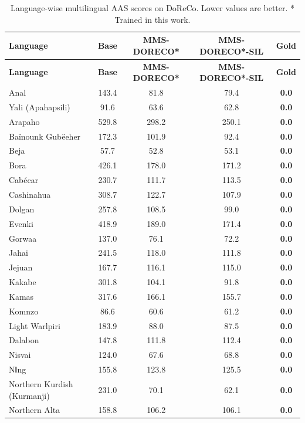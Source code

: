 \begingroup
\scriptsize
\setlength{\tabcolsep}{3pt}
\renewcommand{\arraystretch}{0.92}
\begin{longtable}{lcccc}
\caption{Language-wise multilingual AAS scores on DoReCo. Lower values are better. * Trained in this work.}\label{tab:aas_table_doreco}\\
\toprule
\textbf{Language} 
& \textbf{Base}& \textbf{MMS-DORECO*}& \textbf{MMS-DORECO*-SIL}& \textbf{Gold}\\
\midrule
\endfirsthead
\toprule
\textbf{Language} 
& \textbf{Base}& \textbf{MMS-DORECO*}& \textbf{MMS-DORECO*-SIL}& \textbf{Gold}\\
\midrule
\endhead
\bottomrule
\endfoot
Anal & 143.4 & 81.8 & 79.4 & \textbf{0.0} \\
Yali (Apahapsili) & 91.6 & 63.6 & 62.8 & \textbf{0.0} \\
Arapaho & 529.8 & 298.2 & 250.1 & \textbf{0.0} \\
Baïnounk Gubëeher & 172.3 & 101.9 & 92.4 & \textbf{0.0} \\
Beja & 57.7 & 52.8 & 53.1 & \textbf{0.0} \\
Bora & 426.1 & 178.0 & 171.2 & \textbf{0.0} \\
Cabécar & 230.7 & 111.7 & 113.5 & \textbf{0.0} \\
Cashinahua & 308.7 & 122.7 & 107.9 & \textbf{0.0} \\
Dolgan & 257.8 & 108.5 & 99.0 & \textbf{0.0} \\
Evenki & 418.9 & 189.0 & 171.4 & \textbf{0.0} \\
Gorwaa & 137.0 & 76.1 & 72.2 & \textbf{0.0} \\
Jahai & 241.5 & 118.0 & 111.8 & \textbf{0.0} \\
Jejuan & 167.7 & 116.1 & 115.0 & \textbf{0.0} \\
Kakabe & 301.8 & 104.1 & 91.8 & \textbf{0.0} \\
Kamas & 317.6 & 166.1 & 155.7 & \textbf{0.0} \\
Komnzo & 86.6 & 60.6 & 61.2 & \textbf{0.0} \\
Light Warlpiri & 183.9 & 88.0 & 87.5 & \textbf{0.0} \\
Dalabon & 147.8 & 111.8 & 112.4 & \textbf{0.0} \\
Nisvai & 124.0 & 67.6 & 68.8 & \textbf{0.0} \\
Nǁng & 155.8 & 123.8 & 125.5 & \textbf{0.0} \\
Northern Kurdish (Kurmanji) & 231.0 & 70.1 & 62.1 & \textbf{0.0} \\
Northern Alta & 158.8 & 106.2 & 106.1 & \textbf{0.0} \\

\end{longtable}
